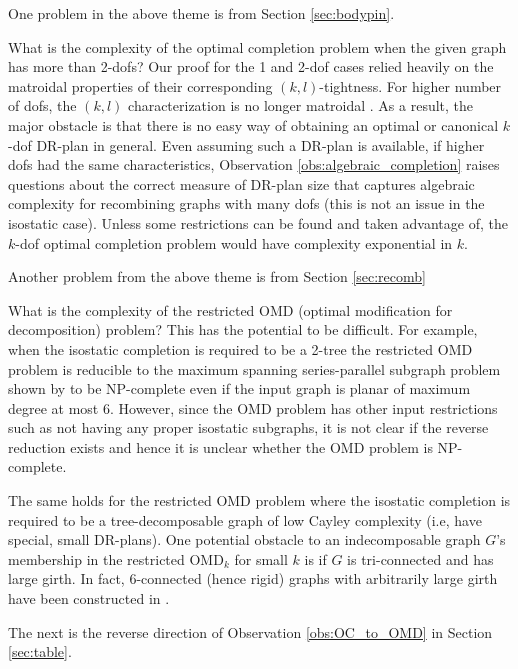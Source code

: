 One problem in the above theme is from
Section \ref{sec:bodypin}.
\begin{openproblem}
    What is the complexity of the optimal completion problem when the given
    graph has more than 2-dofs?
    Our proof for the 1 and 2-dof cases relied heavily on the matroidal
    properties of their corresponding $(k,l)$-tightness.
    For higher number of dofs, the $(k,l)$ characterization is
    no longer matroidal \cite{Lee:2007:PGA}.
    As a result, the major obstacle is that
    there is no easy way of obtaining an optimal or canonical
    $k$-dof DR-plan in general.
    Even assuming such  a DR-plan is available,
    if higher dofs had the same characteristics,
    Observation \ref{obs:algebraic_completion}
    raises questions about the correct measure of DR-plan size that
    captures algebraic complexity for recombining graphs with many dofs
    (this is not an issue in the isostatic case). Unless some restrictions
    can be found and taken advantage of, the $k$-dof optimal
    completion problem would  have complexity exponential in $k$.
\end{openproblem}

Another problem from the above theme is from Section \ref{sec:recomb}
\begin{openproblem}
What is the complexity of the restricted OMD (optimal modification for
decomposition) problem?
This has the potential to be difficult. For example, when the
isostatic completion is required to be a 2-tree the restricted OMD
problem is reducible to the maximum spanning series-parallel subgraph
problem shown by \cite{cai1993spanning} to be NP-complete even if the input
graph is planar of maximum degree at most 6. However, since the OMD
problem has other input restrictions such as not having any proper
isostatic subgraphs, it is not clear if the reverse reduction exists
and hence it is unclear whether the OMD problem is NP-complete.

The same holds for the restricted OMD problem where the isostatic
completion is required to be a tree-decomposable graph of low
Cayley complexity (i.e, have special, small DR-plans). One potential
obstacle to an indecomposable graph $G$'s membership in the restricted
OMD$_k$ for small $k$ is if $G$ is tri-connected and has large girth.
In fact, 6-connected (hence rigid) graphs with arbitrarily large girth
have been constructed in \cite{servatius2000rigidity}.
\end{openproblem}

The next is the reverse direction of Observation \ref{obs:OC_to_OMD} in
Section \ref{sec:table}.

